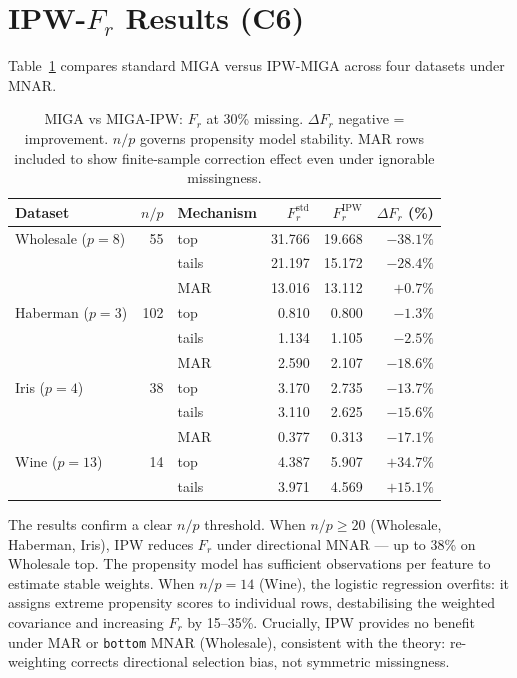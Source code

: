 \section{IPW-\texorpdfstring{$F_r$}{Fr} Results (C6)}

Table~\ref{tab:ipw} compares standard MIGA versus IPW-MIGA across four datasets under MNAR.

\begin{table}[h]
\caption{MIGA vs MIGA-IPW: $F_r$ at 30\% missing. $\Delta F_r$ negative = improvement. $n/p$ governs propensity model stability. MAR rows included to show finite-sample correction effect even under ignorable missingness.}
\label{tab:ipw}
\centering
\begin{tabular}{lrlrrr}
\toprule
\textbf{Dataset} & $n/p$ & \textbf{Mechanism} & $F_r^{\text{std}}$ & $F_r^{\text{IPW}}$ & $\Delta F_r$ (\%) \\
\midrule
Wholesale ($p=8$) & 55 & top    & 31.766 & 19.668 & \textbf{$-38.1\%$} \\
                  &    & tails  & 21.197 & 15.172 & $-28.4\%$ \\
                  &    & MAR    & 13.016 & 13.112 & $+0.7\%$ \\
\midrule
Haberman ($p=3$)  & 102 & top   & 0.810  & 0.800  & $-1.3\%$ \\
                  &     & tails & 1.134  & 1.105  & $-2.5\%$ \\
                  &     & MAR   & 2.590  & 2.107  & $-18.6\%$ \\
\midrule
Iris ($p=4$)      & 38 & top    & 3.170  & 2.735  & $-13.7\%$ \\
                  &    & tails  & 3.110  & 2.625  & $-15.6\%$ \\
                  &    & MAR    & 0.377  & 0.313  & $-17.1\%$ \\
\midrule
Wine ($p=13$)     & 14 & top    & 4.387  & 5.907  & $\mathbf{+34.7\%}$ \\
                  &    & tails  & 3.971  & 4.569  & $+15.1\%$ \\
\bottomrule
\end{tabular}
\end{table}

The results confirm a clear $n/p$ threshold. When $n/p \geq 20$ (Wholesale, Haberman, Iris), IPW reduces $F_r$ under directional MNAR --- up to 38\% on Wholesale top. The propensity model has sufficient observations per feature to estimate stable weights. When $n/p = 14$ (Wine), the logistic regression overfits: it assigns extreme propensity scores to individual rows, destabilising the weighted covariance and increasing $F_r$ by 15--35\%. Crucially, IPW provides no benefit under MAR or \texttt{bottom} MNAR (Wholesale), consistent with the theory: re-weighting corrects directional selection bias, not symmetric missingness.

